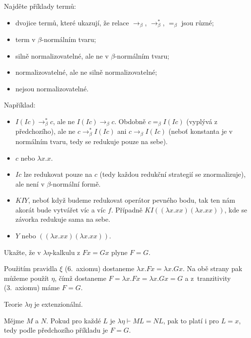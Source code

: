 \documentclass[12pt]{article}					%
\begin{document}
	\begin{priklad}[6.1]
		Najděte příklady termů:
		\begin{itemize}
			\item dvojice termů, které ukazují, že relace $\rightarrow_β$, $\rightarrow_β^*$, $=_β$ jsou různé;
			\item term v $β$-normálním tvaru;
			\item silně normalizovatelné, ale ne v $β$-normálním tvaru;
			\item normalizovatelné, ale ne silně normalizovatelné;
			\item nejsou normalizovatelné.
		\end{itemize}

		\begin{reseni}
			Například:
			\begin{itemize}
				\item $I(Ic) \rightarrow_β^* c$, ale ne $I(Ic) \rightarrow_β c$. Obdobně $c =_β I(Ic)$ (vyplývá z předchozího), ale ne $c \rightarrow_β^* I(Ic)$ ani $c \rightarrow_β I(Ic)$ (neboť konstanta je v normálním tvaru, tedy se redukuje pouze na sebe).
				\item $c$ nebo $λx.x$.
				\item $Ic$ lze redukovat pouze na $c$ (tedy každou redukční strategií se znormalizuje), ale není v $β$-normální formě.
				\item $KIY$, neboť když budeme redukovat operátor pevného bodu, tak ten nám akorát bude vytvářet víc a víc $f$. Případně $KI((λx.xx)(λx.xx))$, kde se závorka redukuje sama na sebe.
				\item $Y$ nebo $((λx.xx)(λx.xx))$.
			\end{itemize}
		\end{reseni}
	\end{priklad}
\pagebreak
	\begin{priklad}[7a]
		Ukažte, že v $λη$-kalkulu z $Fx = Gx$ plyne $F = G$.
		
		\begin{dukazin}
			Použitím pravidla $ξ$ (6.~axiomu) dostaneme $λx.Fx = λx.Gx$. Na obě strany pak můžeme použít $η$, čímž dostaneme $F = λx.Fx = λx.Gx = G$ a z~tranzitivity (3.~axiomu) máme $F = G$.
		\end{dukazin}
	\end{priklad}

	\begin{priklad}[7d.2]
		Teorie $λη$ je extenzionální.

		\begin{dukazin}
			Mějme $M$ a $N$. Pokud pro každé $L$ je $λη \vdash ML = NL$, pak to platí i pro $L = x$, tedy podle předchozího příkladu je $F = G$.
		\end{dukazin}
	\end{priklad}
\end{document}
